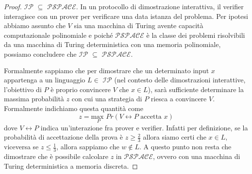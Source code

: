\documentclass{article}
\theoremstyle{definition}
\begin{document}
\begin{proof}
    \texttt{$\mathcal{IP}$} $\subseteq$ \texttt{$\mathcal{PSPACE}$}. In un protocollo di dimostrazione interattiva, il verifier interagisce con un prover per verificare una data istanza del problema. Per ipotesi abbiamo assunto che $V$ sia una macchina di Turing avente capacità computazionale polinomiale e poiché \texttt{$\mathcal{PSPACE}$} è la classe dei problemi risolvibili da una macchina di Turing deterministica con una memoria polinomiale, possiamo concludere che \texttt{$\mathcal{IP}$} $\subseteq$ \texttt{$\mathcal{PSPACE}$}.

    Formalmente sappiamo che per dimostrare che un determinato input $x$ appartenga a un linguaggio $L \in$ \texttt{$\mathcal{IP}$} (nel contesto delle dimostrazioni interattive, l'obiettivo di $P$ è proprio convincere $V$ che $x \in L$), sarà sufficiente determinare la massima probabilità $z$ con cui una strategia di $P$ riesca a convincere $V$. Formalmente indichiamo questa quantità come
    \begin{equation*}
        z = \underset{P}{\text{max }} Pr\left(V \leftrightarrow P \text{ accetta } x\right)
    \end{equation*}
    dove $V \leftrightarrow P$ indica un'interazione fra prover e verifier.
    Infatti per definizione, se la probabilità di accettazione della prova è $z \geq \frac{2}{3}$ allora siamo certi che $x \in L$, viceversa se $z\leq \frac{1}{3}$, allora sappiamo che $w \notin L$. A questo punto non resta che dimostrare che è possibile calcolare $z$ in 
    \texttt{$\mathcal{PSPACE}$}, ovvero con una macchina di Turing deterministica a memoria discreta.


\end{proof}
\end{document}
